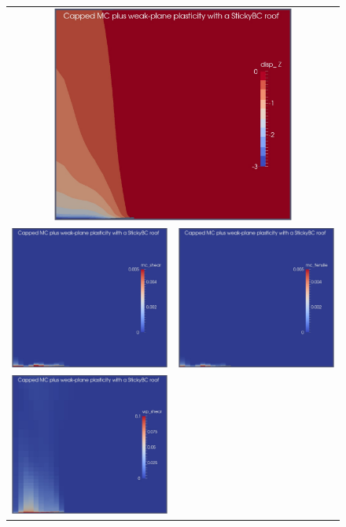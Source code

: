 \documentclass[]{scrreprt}
\begin{document}
\begin{figure}[p]
\begin{center}
\begin{tabular}{cc}
\multicolumn{2}{c}{\includegraphics[width=8cm]{mc_wp_sticky_disp.pdf}}
  \\
\includegraphics[width=6cm]{mc_wp_sticky_mc_shear.pdf} &
\includegraphics[width=6cm]{mc_wp_sticky_mc_tensile.pdf} \\
\includegraphics[width=6cm]{mc_wp_sticky_wp_shear.pdf} &

\end{tabular}
\end{center}
\end{figure}
\end{document}
